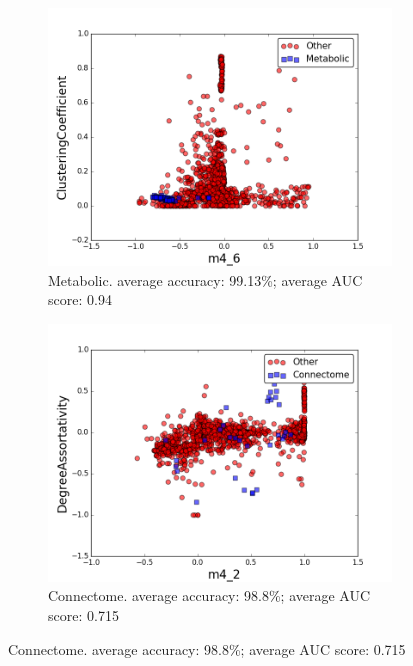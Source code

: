 \documentclass{article}
\begin{document}
\begin{figure}[H]
\medskip
\begin{subfigure}{0.48\textwidth}
\includegraphics[width=\linewidth]{figs/one_by_many/metabolic/2d.png}
\caption{Metabolic. average accuracy: 99.13\%; average AUC score: 0.94} \label{metabolic_2d}
\end{subfigure}\hspace*{\fill}
\begin{subfigure}{0.48\textwidth}
\includegraphics[width=\linewidth]{figs/one_by_many/connectome/2d.png}
\caption{Connectome. average accuracy: 98.8\%; average AUC score: 0.715} \label{connectome_2d}
\end{subfigure}


\end{figure}
\end{document}
